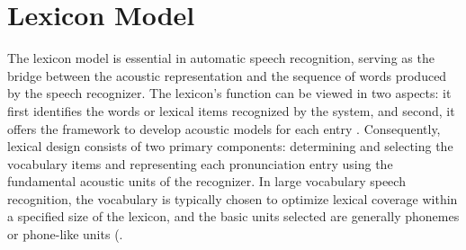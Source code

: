 \begin{comment}
This chapter  contains a review of research papers that:
%
%
\begin{itemize}
\item Describes work on a research area that is similar or relevant to yours
\item Describes work on a domain that is similar or relevant to yours
\item Uses an algorithm that may be useful to your work
\item Uses a software / tool that may be useful to your work
\end{itemize}

It also contains a review of software systems that:
%
%
\begin{itemize}
   \item Belongs to a research area similar to yours
   \item Addresses a need or domain similar to yours
   \item Is your predecessor
\end{itemize}
\end{comment}

\section{Lexicon Model}
\label{sec:LexiconModel}

The lexicon model is essential in automatic speech recognition, serving as the bridge between the acoustic representation and the sequence of words produced by the speech recognizer. The lexicon's function can be viewed in two aspects: it first identifies the words or lexical items recognized by the system, and second, it offers the framework to develop acoustic models for each entry . Consequently, lexical design consists of two primary components: determining and selecting the vocabulary items and representing each pronunciation entry using the fundamental acoustic units of the recognizer. In large vocabulary speech recognition, the vocabulary is typically chosen to optimize lexical coverage within a specified size of the lexicon, and the basic units selected are generally phonemes or phone-like units (.

